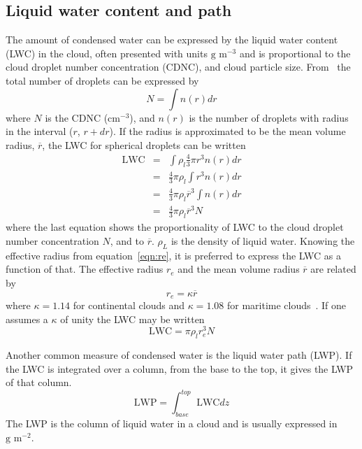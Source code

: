 \subsection{Liquid water content and path}
\label{subsec:lwc}
The amount of condensed water can be expressed by the liquid water content (LWC) in the cloud, often presented with units $\text{g~m}^{-3}$ and is proportional to the cloud droplet number concentration (CDNC), and cloud particle size. From~\citet{Rogers1989} the total number of droplets can be expressed by
\begin{equation}
N = \int n(r) dr
\end{equation}
where $N$ is the CDNC ($\text{cm}^{-3}$), and $n(r)$ is the number of droplets with radius in the interval ($r$, $r + dr$). If the radius is approximated to be the mean volume radius, $\overline{r}$, the LWC for spherical droplets can be written
\begin{eqnarray}
\text{LWC} &=& \int \rho_l \frac{4}{3} \pi r^3 n(r) dr\\
&=& \frac{4}{3} \pi \rho_l \int r^3 n(r) dr\\
&=& \frac{4}{3} \pi \rho_l \overline{r}^3 \int n(r) dr\\
&=& \frac{4}{3} \pi \rho_l \overline{r}^3 N 
\end{eqnarray}
where the last equation shows the proportionality of LWC to the cloud droplet number concentration $N$, and to $\overline{r}$. $\rho_L$ is the density of liquid water. Knowing the effective radius from equation~\ref{eqn:re}, it is preferred to express the LWC as a function of that. The effective radius $r_e$ and the mean volume radius $\overline{r}$ are related by
\begin{equation}
r_e = \kappa \overline{r}
\end{equation}
where $\kappa = 1.14$ for continental clouds and $\kappa = 1.08$ for maritime clouds~\citep{Martin1994}. If one assumes a $\kappa$ of unity the LWC may be written
\begin{equation}
\text{LWC} = \pi \rho_l r_e^3 N
\label{eqn:LWC}
\end{equation}

Another common measure of condensed water is the liquid water path (LWP).
If the LWC is integrated over a column, from the base to the top, it gives the LWP of that column.
\begin{equation}
\text{LWP} = \int_{base}^{top} \text{LWC} dz
\end{equation}
The LWP is the column of liquid water in a cloud and is usually expressed in $\text{g~m}^{-2}$.

